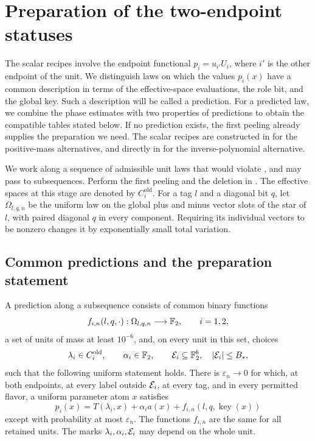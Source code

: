 \section{Preparation of the two-endpoint statuses}
\label{sec:preparation}

The scalar recipes involve the endpoint functional
\(p_i=u_{i'}U_i\), where \(i'\) is the other endpoint of the unit.
We distinguish laws on which the values \(p_i(x)\) have a common description in
terms of the effective-space evaluations, the role bit, and the
global key. Such a description will be called a prediction.
For a predicted law, we combine the phase estimates with two
properties of predictions to obtain the compatible tables stated
below. If no prediction exists, the first peeling already supplies
the preparation we need. The scalar recipes are constructed in
 for the positive-mass alternatives, and
directly in  for the inverse-polynomial
alternative.

We work along a sequence of admissible unit laws that would violate
, and may pass to subsequences.
Perform the first peeling and the deletion in
. The effective spaces at this stage
are denoted by \(C_i^{\mathrm{old}}\). For a tag \(l\) and a
diagonal bit \(q\), let \(\Omega_{l,q,n}\) be the uniform law on
the global plus and minus vector slots of the star of \(l\),
with paired diagonal \(q\) in every component. Requiring its
individual vectors to be nonzero changes it by exponentially
small total variation.

\subsection{Common predictions and the preparation statement}

\begin{definition}
\label{def:prediction}
A prediction along a subsequence consists of common binary
functions
\[
 f_{i,n}(l,q,\cdot):\Omega_{l,q,n}\longrightarrow\mathbb F_2,
 \qquad i=1,2,
\]
a set of units of mass at least \(10^{-6}\), and, on every
unit in this set, choices
\[
 \lambda_i\in C_i^{\mathrm{old}},\qquad
 \alpha_i\in\mathbb F_2,\qquad
 {\cal E}_i\subseteq\mathbb F_2^b,\quad |{\cal E}_i|\le B_*,
\]
such that the following uniform statement holds. There is
\(\varepsilon_n\to0\) for which, at both endpoints, at every
label outside \({\cal E}_i\), at every tag, and in every
permitted flavor, a uniform parameter atom \(x\) satisfies
\begin{equation}
 p_i(x)=T(\lambda_i,x)+\alpha_i a(x)
          +f_{i,n}(l,q,\operatorname{key}(x))
 \label{eq:prediction}
\end{equation}
except with probability at most \(\varepsilon_n\).
The functions \(f_{i,n}\) are the same for all retained units.
The marks \(\lambda_i,\alpha_i,{\cal E}_i\) may depend on
the whole unit.
\end{definition}

